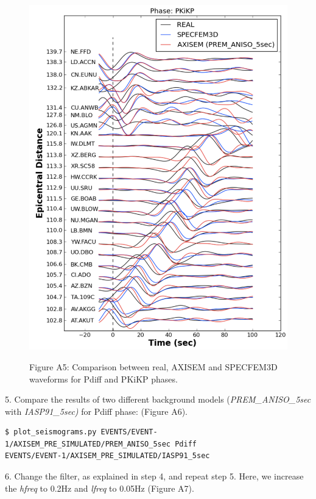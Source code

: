 \documentclass{article}
\begin{document}
\begin{figure}
\begin{minipage}{.5\textwidth}
  \includegraphics[width=1.\linewidth]{AXISEMTutorial-fig011.pdf}
\end{minipage}
\begin{center}
{\small{}Figure A5: Comparison between real, AXISEM and SPECFEM3D waveforms for 
Pdiff and PKiKP phases.}
\end{center}
\end{figure}

5. Compare the results of two different background models (\textit{PREM\_ANISO\_5sec} with 
\textit{IASP91\_5sec)} for Pdiff phase: (Figure A6).

\begin{verbatim}
$ plot_seismograms.py EVENTS/EVENT-1/AXISEM_PRE_SIMULATED/PREM_ANISO_5sec Pdiff 
EVENTS/EVENT-1/AXISEM_PRE_SIMULATED/IASP91_5sec
\end{verbatim}

6. Change the filter, as explained in step 4, and repeat step 5. Here, we increase 
the \textit{hfreq} to 0.2Hz and \textit{lfreq} to 0.05Hz (Figure A7).
\end{document}
